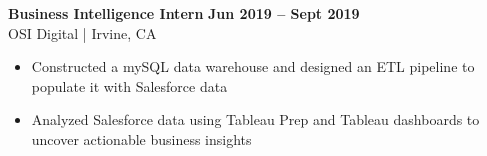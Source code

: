 \textbf{Business Intelligence Intern} \hfill \textbf{Jun 2019 -- Sept 2019} \\
OSI Digital | Irvine, CA
    \squish
    \begin{itemize}
        \item Constructed a mySQL data warehouse and designed an ETL pipeline to populate it with Salesforce data
        \item Analyzed Salesforce data using Tableau Prep and Tableau dashboards to uncover actionable business insights
    \end{itemize}